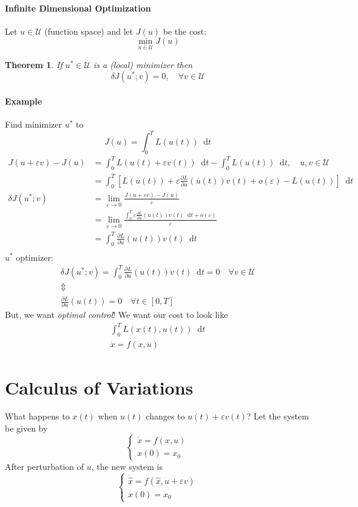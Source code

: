 \documentclass[letterpaper,12pt,titlepage]{report}
\newcommand*\dif{\mathop{}\!\mathrm{d}}
\newcommand*\pder[2]{\frac{\partial #1}{\partial #2}}
\theoremstyle{plain}
\newtheorem*{thm}{Theorem}
\theoremstyle{definition}
\begin{document}
\paragraph{Infinite Dimensional Optimization}
Let $u\in\mathcal U$ (function space) and let $J(u)$ be the cost:
\[ \min_{u\in\mathcal U} J(u) \]

\begin{thm}
  If $u^*\in\mathcal U$ is a (local) minimizer then
  \[ \delta J(u^*;v) = 0, \quad \forall v\in\mathcal U \]
\end{thm}

\paragraph{Example} Find minimizer $u^*$ to
\[ J(u) = \int_0^T L(u(t)) \dif t \]
\begin{align}
  J(u+\varepsilon v) - J(u) &= \int_0^T L(u(t)+\varepsilon v(t)) \dif t - \int_0^T L(u(t)) \dif t, \quad u,v\in\mathcal U \\
                         &= \int_0^T \left[ L(u(t)) + \varepsilon \pder{L}{u}(u(t)) v(t) + o(\varepsilon) - L(u(t)) \right] \dif t \\
  \delta J(u^*;v) &= \lim_{\varepsilon\to0} \frac{J(u+\varepsilon v)-J(u)}{\varepsilon} \\
                         &= \lim_{\varepsilon\to0} \frac{\int_0^T \varepsilon \pder{L}{u}(u(t)) v(t) \dif t + o(\varepsilon)}{\varepsilon} \\
                         &= \int_0^T \pder{L}{u}(u(t)) v(t) \dif t \\
\end{align}
$u^*$ optimizer:
\begin{gather}
  \delta J(u^*;v) = \int_0^T \pder{L}{u}(u(t)) v(t) \dif t = 0 \quad \forall v\in\mathcal U \\
  \Updownarrow \\
  \pder{L}{u} (u(t)) = 0 \quad \forall t\in[0,T]
\end{gather}
But, we want \emph{optimal control}! We want our cost to look like
\begin{gather}
  \int_0^T L(x(t),u(t)) \dif t \\
  \dot x = f(x,u)
\end{gather}

\section{Calculus of Variations}
What happens to $x(t)$ when $u(t)$ changes to $u(t)+\varepsilon v(t)$? Let the system be given by
\[ \begin{cases}
    \dot x = f(x,u) \\
    x(0) = x_0
  \end{cases} \]
After perturbation of $u$, the new system is
\[ \begin{cases}
    \dot{\hat x} = f(\hat x,u+\varepsilon v) \\
    x(0) = x_0
  \end{cases} \]
\end{document}
